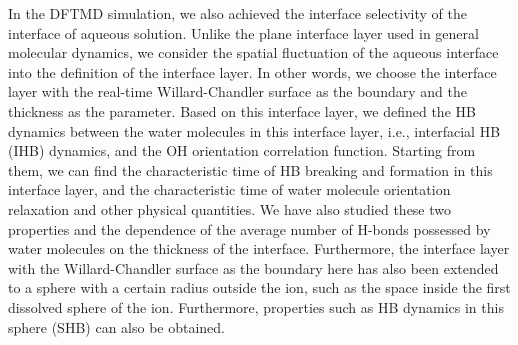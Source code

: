 In the DFTMD simulation, we also achieved the interface selectivity of the interface of aqueous solution. Unlike the plane interface layer used in general molecular dynamics, we consider the spatial fluctuation of the aqueous interface into the definition of the interface layer. In other words, we choose the interface layer with the real-time Willard-Chandler surface as the boundary and the thickness as the parameter. Based on this interface layer, we defined the HB dynamics between the water molecules in this interface layer, i.e., interfacial HB (IHB) dynamics, and the OH orientation correlation function. Starting from them, we can find the characteristic time of HB breaking and formation in this interface layer, and the characteristic time of water molecule orientation relaxation and other physical quantities. We have also studied these two properties and the dependence of the average number of H-bonds possessed by water molecules on the thickness of the interface. Furthermore, the interface layer with the Willard-Chandler surface as the boundary here has also been extended to a sphere with a certain radius outside the ion, such as the space inside the first dissolved sphere of the ion. Furthermore, properties such as HB dynamics in this sphere (SHB) can also be obtained.

